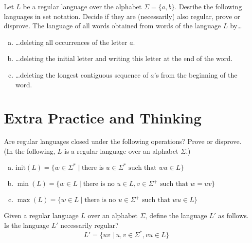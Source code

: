 \documentclass[a4paper,12pt]{amsart}
\begin{document}
\medskip\begin{problem}[Delete]
    
    Let $L$ be a regular language over the alphabet $\Sigma=\{a,b\}$. Desribe the following languages in set notation. Decide if they are (necessarily) also regular, prove or disprove.    
    The language of all words obtained from words of the language $L$ by\dots

    \medskip

    \begin{enumerate}[(a)]\setlength\itemsep{6pt} 
        \item \dots deleting all occurrences of the letter $a$. 
        \item \dots deleting the initial letter and writing this letter at the end of the word. 
        \item \dots deleting the longest contiguous sequence of $a$'s from the beginning of the word.
    \end{enumerate}

\end{problem}


\section*{Extra Practice and Thinking}


\medskip\medskip\begin{problem}[Prefixes]
    Are regular languages closed under the following operations? Prove or disprove. (In the following, $L$ is a regular language over an alphabet $\Sigma$.)
    \begin{enumerate}[(a)]
        \item $\mathrm{init}(L)=\{w\in\Sigma^*\mid \text{there is }u\in\Sigma^*\text{ such that }wu\in L\}$
        \item $\min(L)=\{w\in L\mid \text{there is no }u\in L,v\in\Sigma^+\text{ such that }w=uv\}$
        \item $\max(L)=\{w\in L\mid \text{there is no }u\in\Sigma^+\text{ such that }wu\in L\}$
    \end{enumerate}
\end{problem}  




\medskip\begin{problem}[Shift] 
    Given a regular language $L$ over an alphabet $\Sigma$, define the language $L'$ as follows. Is the language $L'$ necessarily regular? 
    $$
    L'=\{uv\mid u,v\in\Sigma^*,vu\in L\}
    $$ 
\end{problem}  
\end{document}
